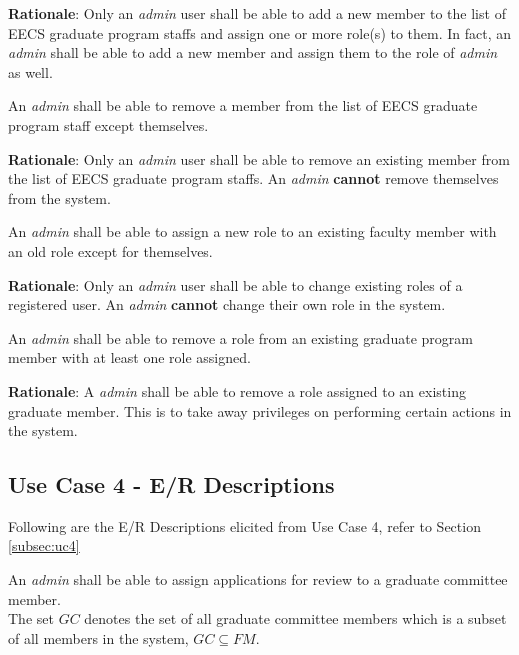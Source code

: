 \documentclass[fontsize=12pt,paper=letter,twoside]{scrartcl}
\begin{document}
\smallskip
\noindent \textbf{Rationale}: Only an \emph{admin} user shall be able to add a new member to the list of EECS graduate program staffs and assign one or more role(s) to them. In fact, an \emph{admin} shall be able to add a new member and assign them to the role of \emph{admin} as well.

\genreq
{An \emph{admin} shall be able to remove a member from the list of EECS graduate program staff except themselves.\\}
{}
\label{R9}

\smallskip
\noindent \textbf{Rationale}: Only an \emph{admin} user shall be able to remove an existing member from the list of EECS graduate program staffs. An \emph{admin} \textbf{cannot} remove themselves from the system.

\genreq
{An \emph{admin} shall be able to assign a new role to an existing faculty member with an old role except for themselves.\\}
{}
\label{R10}

\smallskip
\noindent \textbf{Rationale}: Only an \emph{admin} user shall be able to change existing roles of a registered user. An \emph{admin} \textbf{cannot} change their own role in the system.

\genreq
{An \emph{admin} shall be able to remove a role from an existing graduate program member with at least one role assigned.\\}
{}
\label{R11}

\smallskip
\noindent \textbf{Rationale}: A \emph{admin} shall be able to remove a role assigned to an existing graduate member. This is to take away privileges on performing certain actions in the system. 

\subsection{Use Case 4 - E/R Descriptions}

Following are the E/R Descriptions elicited from Use Case 4, refer to Section \ref{subsec:uc4}


\rdescription
{An \emph{admin} shall be able to assign applications for review to a graduate committee member.\\}
{The set $GC$ denotes the set of all graduate committee members which is a subset of all members in the system, $GC \subseteq FM$.}
\label{R12}
\end{document}

